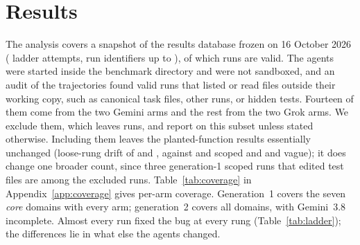 \FloatBarrier
\section{Results}
\label{sec:results}

The analysis covers a snapshot of the results database frozen on 16 October
2026 (\SnapshotRunCount{} ladder attempts, run identifiers up to
\SnapshotMaxRunId{}), of which \NValid{} runs are valid. The agents were
started inside the benchmark directory and were not sandboxed, and an audit of
the trajectories found \NEscapedRuns{} valid runs that listed or read files
outside their working copy, such as canonical task files, other runs, or hidden
tests. Fourteen of them come from the two Gemini arms and the rest from the two Grok
arms. We exclude them, which
leaves \NValidNoEsc{} runs, and report on this subset unless stated otherwise. Including them leaves
the planted-function results essentially unchanged (loose-rung drift of
\GoneLooseDriftFrac{} and \GtwoLooseDriftFrac{}, against \GoneScopedDriftFrac{}
and \GtwoScopedDriftFrac{} scoped and \GoneVagueDriftFrac{} and
\GtwoVagueDriftFrac{} vague); it does change one broader count, since three
generation-1 scoped runs that edited test files are among the excluded runs.
Table~\ref{tab:coverage} in Appendix~\ref{app:coverage} gives per-arm
coverage. Generation~1 covers the seven \emph{core} domains with every arm;
generation~2 covers all \NDomains{} domains, with Gemini~3.8 incomplete.
Almost every run fixed the bug at every rung (Table~\ref{tab:ladder}); the
differences lie in what else the agents changed.

